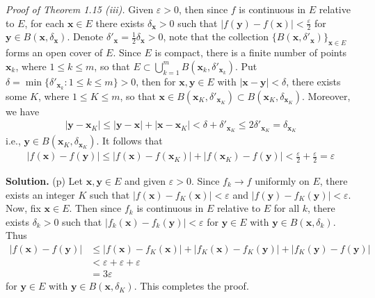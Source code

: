 \documentclass[12pt]{article}
\theoremstyle{definition}
\begin{document}
\textit{Proof of Theorem 1.15 (iii).} Given $\varepsilon>0$, then since $f$ is continuous in $E$ relative to $E$, for each $\mathbf{x}\in E$ there exists $\delta_{\mathbf{x}}>0$ such that $\left\vert f(\mathbf{y})-f(\mathbf{x})\right\vert<\frac{\varepsilon}{2}$ for $\mathbf{y}\in B(\mathbf{x},\delta_{\mathbf{x}})$. Denote $\delta'_{\mathbf{x}}=\frac{1}{2}\delta_{\mathbf{x}}>0$, note that the collection $\{B(\mathbf{x},\delta'_{\mathbf{x}})\}_{\mathbf{x}\in E}$ forms an open cover of $E$. Since $E$ is compact, there is a finite number of points $\mathbf{x}_k$, where $1\le k\le m$, so that $E\subset \bigcup_{k=1}^mB(\mathbf{x}_k,\delta'_{\mathbf{x}_k})$. Put $\delta=\min\{\delta'_{\mathbf{x}_k}:1\le k\le m\}>0$, then for $\mathbf{x},\mathbf{y}\in E$ with $\left\vert\mathbf{x}-\mathbf{y}\right\vert<\delta$, there exists some $K$, where $1\le K\le m$, so that $\mathbf{x}\in B(\mathbf{x}_K,\delta'_{\mathbf{x}_K})\subset B(\mathbf{x}_K,\delta_{\mathbf{x}_K})$. Moreover, we have
\begin{align*}
\left\vert\mathbf{y}-\mathbf{x}_K\right\vert
\le \left\vert\mathbf{y}-\mathbf{x}\right\vert+\left\vert\mathbf{x}-\mathbf{x}_K\right\vert
<\delta+\delta'_{\mathbf{x}_K}
\le 2\delta'_{\mathbf{x}_K}
=\delta_{\mathbf{x}_K}
\end{align*}
i.e., $\mathbf{y}\in B(\mathbf{x}_K,\delta_{\mathbf{x}_K})$. It follows that
\begin{align*}
\left\vert f(\mathbf{x})-f(\mathbf{y})\right\vert
\le\left\vert f(\mathbf{x})-f(\mathbf{x}_K)\right\vert+\left\vert f(\mathbf{x}_K)-f(\mathbf{y})\right\vert
<\frac{\varepsilon}{2}+\frac{\varepsilon}{2}
=\varepsilon
\end{align*}

\smallskip
\noindent\textbf{Solution.}\quad
(p) Let $\mathbf{x},\mathbf{y}\in E$ and given $\varepsilon>0$. Since $f_k\to f$ uniformly on $E$, there exists an integer $K$ such that $\left\vert f(\mathbf{x})-f_K(\mathbf{x})\right\vert<\varepsilon$ and $\left\vert f(\mathbf{y})-f_K(\mathbf{y})\right\vert<\varepsilon$. Now, fix $\mathbf{x}\in E$. Then since $f_k$ is continuous in $E$ relative to $E$ for all $k$, there exists $\delta_k>0$ such that $\left\vert f_k(\mathbf{x})-f_k(\mathbf{y})\right\vert<\varepsilon$ for $\mathbf{y}\in E$ with $\mathbf{y}\in B(\mathbf{x},\delta_k)$. Thus
\begin{align*}
\left\vert f(\mathbf{x})-f(\mathbf{y})\right\vert
&\le \left\vert f(\mathbf{x})-f_K(\mathbf{x})\right\vert
+\left\vert f_K(\mathbf{x})-f_K(\mathbf{y})\right\vert
+\left\vert f_K(\mathbf{y})-f(\mathbf{y})\right\vert\\
&<\varepsilon+\varepsilon+\varepsilon\\
&=3\varepsilon
\end{align*}
for $\mathbf{y}\in E$ with $\mathbf{y}\in B(\mathbf{x},\delta_K)$. This completes the proof.
\end{document}
